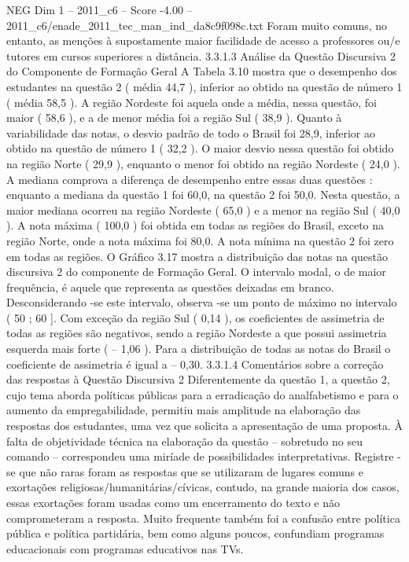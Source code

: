 \begin{textsample}{NEG Dim 1 – 2011\_c6 – Score -4.00 – 2011\_c6/enade\_2011\_tec\_man\_ind\_da8c9f098c.txt}
Foram muito comuns, no entanto, as menções à supostamente maior facilidade de acesso a professores ou/e tutores em cursos superiores a distância. 3.3.1.3 Análise da Questão Discursiva 2 do Componente de Formação Geral A Tabela 3.10 mostra que o desempenho dos estudantes na questão 2 ( média 44,7 ), inferior ao obtido na questão de número 1 ( média 58,5 ).
A região Nordeste foi aquela onde a média, nessa questão, foi maior ( 58,6 ), e a de menor média foi a região Sul ( 38,9 ).
Quanto à variabilidade das notas, o desvio padrão de todo o Brasil foi 28,9, inferior ao obtido na questão de número 1 ( 32,2 ).
O maior desvio nessa questão foi obtido na região Norte ( 29,9 ), enquanto o menor foi obtido na região Nordeste ( 24,0 ).
A mediana comprova a diferença de desempenho entre essas duas questões : enquanto a mediana da questão 1 foi 60,0, na questão 2 foi 50,0.
Nesta questão, a maior mediana ocorreu na região Nordeste ( 65,0 ) e a menor na região Sul ( 40,0 ).
A nota máxima ( 100,0 ) foi obtida em todas as regiões do Brasil, exceto na região Norte, onde a nota máxima foi 80,0.
A nota mínima na questão 2 foi zero em todas as regiões.
O Gráfico 3.17 mostra a distribuição das notas na questão discursiva 2 do componente de Formação Geral.
O intervalo modal, o de maior frequência, é aquele que representa as questões deixadas em branco.
Desconsiderando -se este intervalo, observa -se um ponto de máximo no intervalo ( 50 ; 60 ].
Com exceção da região Sul ( 0,14 ), os coeficientes de assimetria de todas as regiões são negativos, sendo a região Nordeste a que possui assimetria esquerda mais forte ( – 1,06 ).
Para a distribuição de todas as notas do Brasil o coeficiente de assimetria é igual a – 0,30. 3.3.1.4 Comentários sobre a correção das respostas à Questão Discursiva 2 Diferentemente da questão 1, a questão 2, cujo tema aborda políticas públicas para a erradicação do analfabetismo e para o aumento da empregabilidade, permitiu mais amplitude na elaboração das respostas dos estudantes, uma vez que solicita a apresentação de uma proposta.
À falta de objetividade técnica na elaboração da questão – sobretudo no seu comando – correspondeu uma miríade de possibilidades interpretativas.
Registre -se que não raras foram as respostas que se utilizaram de lugares comuns e exortações religiosas/humanitárias/cívicas, contudo, na grande maioria dos casos, essas exortações foram usadas como um encerramento do texto e não comprometeram a resposta.
Muito frequente também foi a confusão entre política pública e política partidária, bem como alguns poucos, confundiam programas educacionais com programas educativos nas TVs.

\end{textsample}
